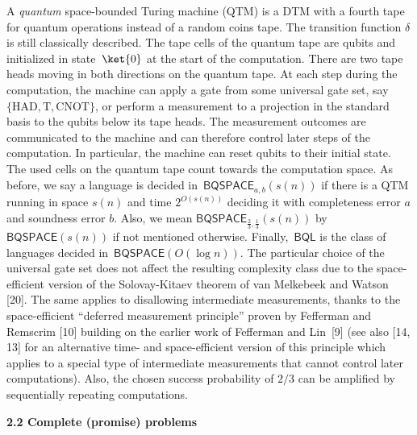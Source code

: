 \documentclass[10pt,a4paper]{article}
\begin{document}
A \emph{quantum} space-bounded Turing machine (QTM) is a DTM with a fourth tape for quantum operations instead of a random coins tape.
The transition function $\delta$ is still classically described. The tape cells of the quantum tape are qubits and initialized in state $\ket{0}$ at the start of the computation. There are two tape heads moving in both directions on the quantum tape. At each step during the computation, the machine can apply a gate from some universal gate set, say $\{\mathrm{HAD},\mathrm{T},\mathrm{CNOT}\}$, or perform a measurement to a projection in the standard basis to the qubits below its tape heads.
The measurement outcomes are communicated to the machine and can therefore control later steps of the computation. In particular, the machine can reset qubits to their initial state.
The used cells on the quantum tape count towards the computation space.
As before, we say a language is decided in $\mathsf{BQSPACE}_{a,b}(s(n))$ if there is a QTM running in space $s(n)$ and time $2^{O(s(n))}$ deciding it with completeness error $a$ and soundness error $b$. Also, we mean $\mathsf{BQSPACE}_{\frac{2}{3},\frac{1}{3}}(s(n))$ by $\mathsf{BQSPACE}(s(n))$ if not mentioned otherwise.
Finally, $\mathsf{BQL}$ is the class of languages decided in $\mathsf{BQSPACE}(O(\log n))$.
The particular choice of the universal gate set does not affect the resulting complexity class due to the space-efficient version of the Solovay-Kitaev theorem of van Melkebeek and Watson [20].
The same applies to disallowing intermediate measurements, thanks to the space-efficient “deferred measurement principle” proven by Fefferman and Remscrim [10] building on the earlier work of Fefferman and Lin [9] (see also [14, 13] for an alternative time- and space-efficient version of this principle which applies to a special type of intermediate measurements that cannot control later computations).
Also, the chosen success probability of $2/3$ can be amplified by sequentially repeating computations.\par





\par\medskip\noindent\textbf{
2.2 Complete (promise) problems}\par
\end{document}
